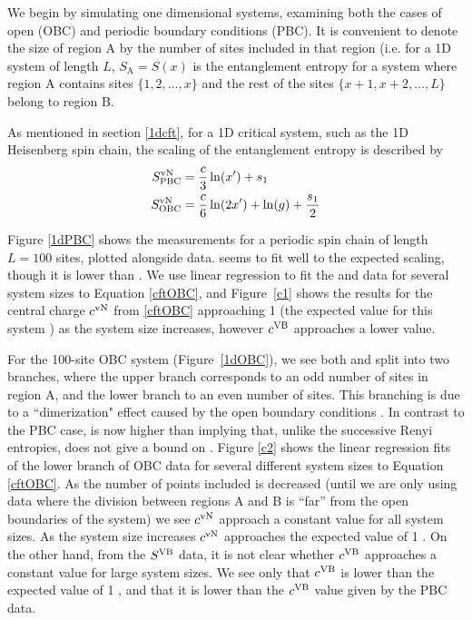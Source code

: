 We begin by simulating one dimensional systems, examining both the cases of
open (OBC) and periodic boundary conditions (PBC).
It is convenient to denote the size of region A by the number of sites included in that region 
(i.e. for a 1D system of length $L$, $S_{\text{A}} = S(x)$ is the entanglement entropy for a system where region A contains sites $\{1,2,\dots,x\}$ and the rest of the sites $\{x+1,x+2,\dots,L\}$
belong to region B.

As mentioned in section \ref{1dcft}, for a 1D critical system, such as the 1D Heisenberg spin chain, the scaling of the entanglement entropy is described by
\begin{align}
	S^{\text{vN}}_{\text{PBC}} &= \frac{c}{3}\ln(x') + s_1 \label{cftPBC}\\
	S^{\text{vN}}_{\text{OBC}} &= \frac{c}{6}\ln(2x') + \ln(g)+ \frac{s_1}{2} \label{cftOBC}
\end{align}



Figure \ref{1dPBC} shows the \vb measurements for a periodic spin chain of length $L=100$ sites, plotted alongside \vn data.  \vb seems to fit well to the expected scaling, though it is lower than \vN.
We use linear regression to fit the \vb and \vn data for several system sizes to Equation \eqref{cftOBC}, and Figure~\ref{c1} shows the results for the central charge $c^{\rm vN}$ from \eqref{cftOBC} approaching 1 (the expected value for this system \cite{c_is_1}) as the system size increases, however $c^{\rm VB}$ approaches a lower value. 




For the 100-site OBC system (Figure~\ref{1dOBC}), we see both \vn and \vb split into two branches, where the upper branch corresponds to an odd number of sites in region A, and the lower branch to an even number of sites.
This branching is due to a ``dimerization" effect caused by the open boundary conditions \cite{Ian1}.
In contrast to the PBC case, \vb is now higher than \vN{} implying that, unlike the successive Renyi entropies, \vb does not give a bound on \vn.
Figure \ref{c2} shows the linear regression fits of the lower branch of OBC data for several different system sizes to Equation \eqref{cftOBC}.  As the number of points included is decreased (until we are only using data where the division between regions A and B is ``far'' from the open boundaries of the system) we see $c^{\rm vN}$ approach a constant value for all system sizes.  As the system size increases $c^{\rm vN}$ approaches the expected value of 1 \cite{c_is_1}.  On the other hand, from the $S^{\rm VB}$ data, it is not clear whether $c^{\rm VB}$ approaches a constant value for large system sizes.  We see only that $c^{\rm VB}$ is lower than the expected value of 1 \cite{Chh}, and that it is lower than the $c^{\rm VB}$ value given by the PBC data.

